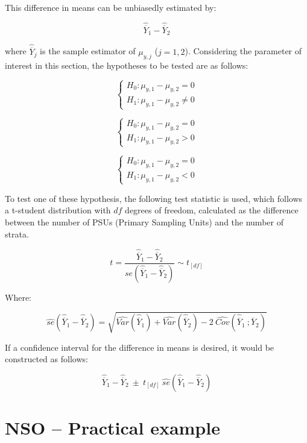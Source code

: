 \documentclass[
  12pt,
]{book}
\begin{document}
This difference in means can be unbiasedly estimated by:

\[
\widehat{\overline{Y}}_{1} - \widehat{\overline{Y}}_{2}
\]

where \(\widehat{\overline{Y}}_{j}\) is the sample estimator of \(\mu_{y,j}\) (\(j = 1, 2\)). Considering the parameter of interest in this section, the hypotheses to be tested are as follows:

\[
\begin{cases}
H_0: \mu_{y,1} - \mu_{y,2} = 0 \\
H_1: \mu_{y,1} - \mu_{y,2} \neq 0
\end{cases} 
\]

\[
\begin{cases}
H_0: \mu_{y,1} - \mu_{y,2} = 0 \\
H_1: \mu_{y,1} - \mu_{y,2} > 0
\end{cases}
\]

\[
\begin{cases}
H_0: \mu_{y,1} - \mu_{y,2} = 0 \\
H_1: \mu_{y,1} - \mu_{y,2} < 0
\end{cases}
\]

To test one of these hypothesis, the following test statistic is used, which follows a t-student distribution with \(df\) degrees of freedom, calculated as the difference between the number of PSUs (Primary Sampling Units) and the number of strata.

\[
t = \frac{\widehat{\overline{Y}}_{1} - \widehat{\overline{Y}}_{2}} {se\left(\widehat{\overline{Y}}_{1} - \widehat{\overline{Y}}_{2}\right)} \sim t_{[df]}
\]

Where:

\[
\widehat{se} \left( \widehat{\overline{Y}}_{1} - \widehat{\overline{Y}}_{2} \right) = \sqrt{\widehat{Var}\left(\widehat{\overline{Y}}_{1}\right) + \widehat{Var}\left(\widehat{\overline{Y}}_{2}\right) - 2 \  \widehat{Cov}\left(\widehat{\overline{Y}}_{1} \ ; \widehat{\overline{Y}}_{2} \right)}
\]

If a confidence interval for the difference in means is desired, it would be constructed as follows:

\[
\widehat{\overline{Y}}_{1} - \widehat{\overline{Y}}_{2} \ \pm \ t_{[df]} \ \widehat{se}\left( \widehat{\overline{Y}}_{1} - \widehat{\overline{Y}}_{2} \right)
\]

\hypertarget{nso-practical-example-1}{%
\section{NSO -- Practical example}\label{nso-practical-example-1}}
\end{document}
